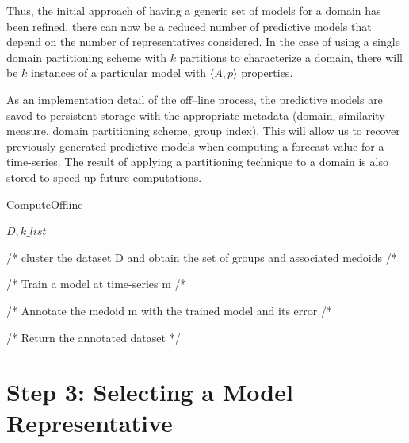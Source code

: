 Thus, the initial approach of having a generic set of models for a domain has been refined, there can now be a reduced number of predictive models that depend on the number of representatives considered. In the case of using a single domain partitioning scheme with $k$ partitions to characterize a domain, there will be $k$ instances of a particular model with $\langle A, p \rangle$ properties. 

As an implementation detail of the off--line process, the predictive models are saved to persistent storage with the appropriate metadata (domain, similarity measure, domain partitioning scheme, group index). This will allow us to recover previously generated predictive models when computing a forecast value for a time-series. The result of applying a partitioning technique to a domain is also stored to speed up future computations.


\begin{algorithm}[h!]
\caption{ComputeOffline}\label{alg:offline}
\begin{algorithmic}[1] 
 {$D,k\_list $}


 /* cluster the dataset D and obtain the set of groups and associated medoids  /*
 
 
 /* Train a model at time-series m /*
 
 /* Annotate the medoid m with the trained model and its error /*
 \EndFor
 
 
\EndFor

/* Return the annotated dataset */

\EndFunction 
\end{algorithmic} 
\end{algorithm} 

\section{Step 3: Selecting a Model Representative}
\label{Sec:KnowledgExtraction}

